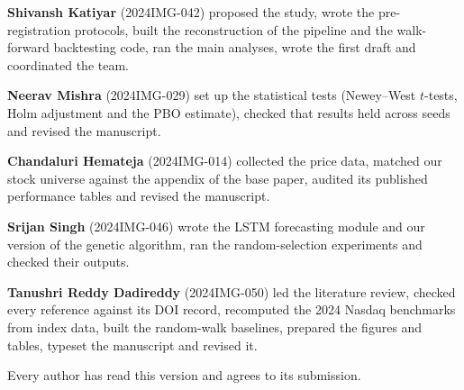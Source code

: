 \begin{list}{}{\setlength\leftmargin{1em}\setlength\itemindent{-1em}\setlength\itemsep{1.5pt}\setlength\parsep{0pt}\setlength\topsep{3pt}}
\item \textbf{Shivansh Katiyar} (2024IMG-042) proposed the study, wrote the pre-registration protocols, built the reconstruction of the pipeline and the walk-forward backtesting code, ran the main analyses, wrote the first draft and coordinated the team.
\item \textbf{Neerav Mishra} (2024IMG-029) set up the statistical tests (Newey--West $t$-tests, Holm adjustment and the PBO estimate), checked that results held across seeds and revised the manuscript.
\item \textbf{Chandaluri Hemateja} (2024IMG-014) collected the price data, matched our stock universe against the appendix of the base paper, audited its published performance tables and revised the manuscript.
\item \textbf{Srijan Singh} (2024IMG-046) wrote the LSTM forecasting module and our version of the genetic algorithm, ran the random-selection experiments and checked their outputs.
\item \textbf{Tanushri Reddy Dadireddy} (2024IMG-050) led the literature review, checked every reference against its DOI record, recomputed the 2024 Nasdaq benchmarks from index data, built the random-walk baselines, prepared the figures and tables, typeset the manuscript and revised it.
\end{list}
\noindent Every author has read this version and agrees to its submission.

